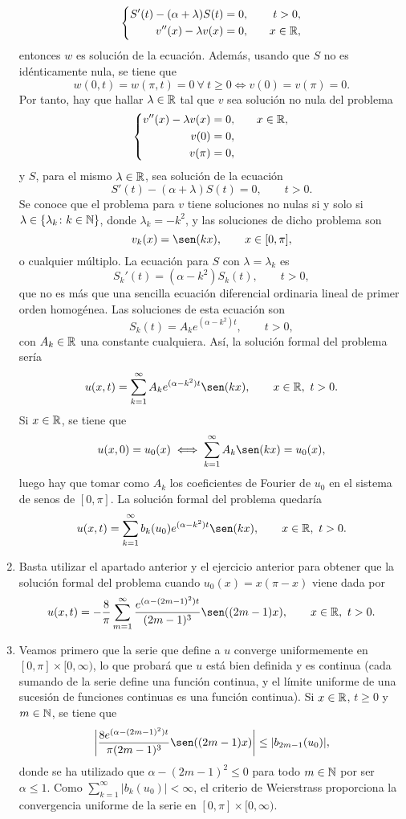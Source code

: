 \documentclass[a4paper, 12pt, extrafontsizes]{memoir}
\begin{document}
\begin{solution}
\begin{enumerate}
    \[\left\{\begin{alignedat}{3}
        S'(t) -(\alpha+\lambda)S(t) &= 0, \qquad &t > 0, \\
        v''(x) - \lambda v(x) &=0, \qquad &x \in \mathbb R,
    \end{alignedat}\right.\]
    entonces $w$ es solución de la ecuación. Además, usando que $S$ no es idénticamente nula, se tiene que
    \[w(0,t) = w(\pi,t) = 0 \ \forall \ t \geq 0 \iff v(0) = v(\pi) =  0. \]
    Por tanto, hay que hallar $\lambda \in \mathbb R$ tal que $v$ sea solución no nula del problema
    \[\left\{\begin{alignedat}{3}
        v''(x) - \lambda v(x) &=0, \qquad &x \in \mathbb R, \\
        v(0) &= 0, \\
        v(\pi) &= 0,
    \end{alignedat}\right.\]
    y $S$, para el mismo $\lambda \in \mathbb R$, sea solución de la ecuación
    \[S'(t) -(\alpha+\lambda)S(t) = 0, \qquad t > 0.\]
    Se conoce que el problema para $v$ tiene soluciones no nulas si y solo si $\lambda \in \{\lambda_k \colon k \in \mathbb N\}$, donde $\lambda_k = -k^2$, y las soluciones de dicho problema son
    \[v_k(x) = \sen(kx) , \qquad x \in [0,\pi],\]
    o cualquier múltiplo. La ecuación para $S$ con $\lambda = \lambda_k$ es
    \[S_k'(t) =(\alpha-k^2)S_k(t), \qquad t > 0,\]
    que no es más que una sencilla ecuación diferencial ordinaria lineal de primer orden homogénea. Las soluciones de esta ecuación son
    \[S_{k}(t) = A_ke^{(\alpha-k^2)t}, \qquad t > 0,\]
    con $A_k \in \mathbb R$ una constante cualquiera. Así, la solución formal del problema sería
    \[u(x,t) = \sum_{k=1}^\infty A_ke^{(\alpha-k^2)t}\sen(kx), \qquad x \in \R, \ t > 0.\]
    Si $x \in \mathbb R$, se tiene que
    \[u(x,0) = u_0(x) \iff \sum_{k=1}^\infty A_k\sen(kx) = u_0(x),\]
    luego hay que tomar como $A_k$ los coeficientes de Fourier de $u_0$ en el sistema de senos de $[0,\pi]$. La solución formal del problema quedaría
    \[u(x,t) = \sum_{k=1}^\infty b_k(u_0)e^{(\alpha-k^2)t}\sen(kx), \qquad x \in \R, \ t > 0.\]
    \item Basta utilizar el apartado anterior y el ejercicio anterior para obtener que la solución formal del problema cuando $u_0(x) = x(\pi-x)$ viene dada por
    \[u(x,t) =-\frac{8}{\pi} \sum_{m=1}^\infty\frac{e^{(\alpha-(2m-1)^2)t}}{(2m-1)^3}\sen((2m-1)x), \qquad x \in \R, \ t > 0.\]
    \item Veamos primero que la serie que define a $u$ converge uniformemente en $[0,\pi] \times [0,\infty)$, lo que probará que $u$ está bien definida y es continua (cada sumando de la serie define una función continua, y el límite uniforme de una sucesión de funciones continuas es una función continua). Si $x \in \mathbb R$, $t \geq 0$ y $m \in \mathbb N$, se tiene que
    \[\biggl|\frac{8e^{(\alpha-(2m-1)^2)t}}{\pi(2m-1)^3}\sen((2m-1)x)\biggr| \leq |b_{2m-1}(u_0)|,\]
    donde se ha utilizado que $\alpha - (2m-1)^2 \leq 0$ para todo $m \in \mathbb N$ por ser $\alpha \leq 1$.
    Como $\sum_{k=1}^\infty |b_k(u_0)| < \infty$, el criterio de Weierstrass proporciona la convergencia uniforme de la serie en $[0,\pi] \times[0,\infty)$.


\end{enumerate}
\end{solution}
\end{document}
